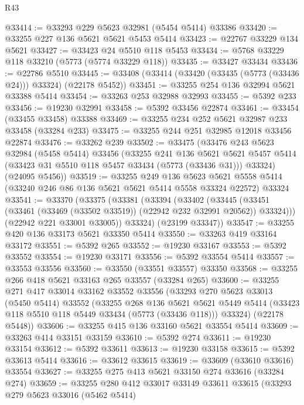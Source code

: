 \begin{lexlean}{R43}
\begin{coremodule}
@33414 := @33293 @229 @5623 @32981 (@5454 @5414) @33386
@33420 := @33255 @227 @136 @5621 @5621 @5453 @5414
@33423 := @22767 @33229 @134 @5621
@33427 := @33423 @24 @5510 @118 @5453
@33434 := @5768 @33229 @118 @33210 (@5773 (@5774 @33229 @118))
@33435 := @33427 @33434
@33436 := @22786 @5510
@33445 := @33408 (@33414 (@33420 (@33435 (@5773 (@33436 @24))) @33324) (@22178 @5452))
@33451 := @33255 @254 @136 @32994 @5621 @33388 @5414
@33454 := @33263 @253 @32988 @32993
@33455 := @5392 @233
@33456 := @19230 @32991
@33458 := @5392 @33456 @22874
@33461 := @33454 (@33455 @33458) @33388
@33469 := @33255 @234 @252 @5621 @32987 @233 @33458 (@33284 @233)
@33475 := @33255 @244 @251 @32985 @12018 @33456 @22874
@33476 := @33262 @239
@33502 := @33475
    (@33476
      @243
      @5623
      @32984
      (@5458 @5414)
      @33456
      (@33255
        @241
        @136
        @5621
        @5621
        @5457
        @5414
        (@33423 @31 @5510 @118 @5457 @33434 (@5773 (@33436 @31)))
        @33324)
      (@24095 @5456))
@33519 := @33255
    @249
    @136
    @5623
    @5621
    @5558
    @5414
    (@33240 @246 @86 @136 @5621 @5621 @5414 @5558 @33324 @22572)
    @33324
@33541 := @33370
    (@33375
      (@33381
        (@33394
          (@33402
            (@33445 (@33451 (@33461 (@33469 (@33502 @33519)) (@22942 @232 @32991 @20562)) @33324)))
          (@22942 @221 @33001 @33005))
        @33324)
      (@23199 @33347))
@33547 := @33255 @420 @136 @33173 @5621 @33350 @5414
@33550 := @33263 @419 @33164 @33172
@33551 := @5392 @265
@33552 := @19230 @33167
@33553 := @5392 @33552
@33554 := @19230 @33171
@33556 := @5392 @33554 @5414
@33557 := @33553 @33556
@33560 := @33550 (@33551 @33557) @33350
@33568 := @33255 @266 @418 @5621 @33163 @265 @33557 (@33284 @265)
@33600 := @33255
    @271
    @417
    @33014
    @33162
    @33552
    @33556
    (@33293
      @270
      @5623
      @33013
      (@5450 @5414)
      @33552
      (@33255
        @268
        @136
        @5621
        @5621
        @5449
        @5414
        (@33423 @118 @5510 @118 @5449 @33434 (@5773 (@33436 @118)))
        @33324)
      (@22178 @5448))
@33606 := @33255 @415 @136 @33160 @5621 @33554 @5414
@33609 := @33263 @414 @33151 @33159
@33610 := @5392 @274
@33611 := @19230 @33154
@33612 := @5392 @33611
@33613 := @19230 @33158
@33615 := @5392 @33613 @5414
@33616 := @33612 @33615
@33619 := @33609 (@33610 @33616) @33554
@33627 := @33255 @275 @413 @5621 @33150 @274 @33616 (@33284 @274)
@33659 := @33255
    @280
    @412
    @33017
    @33149
    @33611
    @33615
    (@33293
      @279
      @5623
      @33016
      (@5462 @5414)

\end{coremodule}
\end{lexlean}
